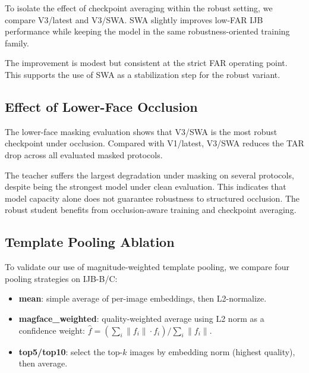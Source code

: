 To isolate the effect of checkpoint averaging within the robust setting, we compare V3/latest and V3/SWA. SWA slightly improves low-FAR IJB performance while keeping the model in the same robustness-oriented training family\cite{izmailov2019averagingweightsleadswider}.



The improvement is modest but consistent at the strict FAR operating point. This supports the use of SWA as a stabilization step for the robust variant.

\subsection{Effect of Lower-Face Occlusion}

The lower-face masking evaluation shows that V3/SWA is the most robust checkpoint under occlusion. Compared with V1/latest, V3/SWA reduces the TAR drop across all evaluated masked protocols.



The teacher suffers the largest degradation under masking on several protocols, despite being the strongest model under clean evaluation. This indicates that model capacity alone does not guarantee robustness to structured occlusion. The robust student benefits from occlusion-aware training and checkpoint averaging.

\subsection{Template Pooling Ablation}

To validate our use of magnitude-weighted template pooling, we compare four pooling strategies on IJB-B/C:
\begin{itemize}
    \item \textbf{mean}: simple average of per-image embeddings, then L2-normalize.
    \item \textbf{magface\_weighted}: quality-weighted average using L2 norm as a confidence weight: $\hat{f} = (\sum_i \|f_i\| \cdot f_i) / \sum_i \|f_i\|$.
    \item \textbf{top5/top10}: select the top-$k$ images by embedding norm (highest quality), then average.
\end{itemize}

